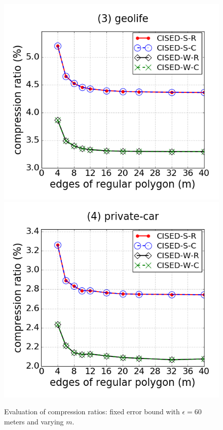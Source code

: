 \begin{figure}[tb!]
\includegraphics[scale = 0.240]{figures/Exp-M-e-60-CR-geolife.png}
\includegraphics[scale = 0.240]{figures/Exp-M-e-60-CR-private.png}
\vspace{-1ex}
\caption{\small Evaluation of compression ratios: fixed error bound with $\epsilon=60$ meters and varying $m$.}
\label{fig:m-cr-e60}
\vspace{-1ex}
\end{figure}



